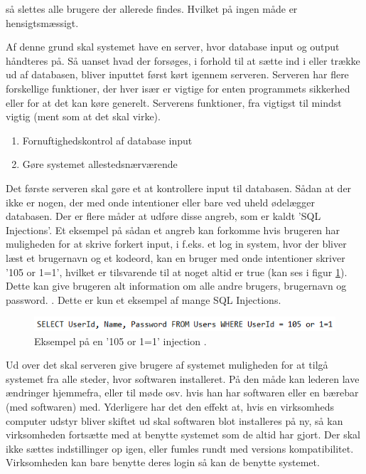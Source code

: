så slettes alle brugere der allerede findes. Hvilket på ingen måde er hensigtsmæssigt.

Af denne grund skal systemet have en server, hvor database input og output håndteres på. Så uanset hvad der forsøges, i forhold til at sætte ind i eller trække ud af databasen, bliver inputtet først kørt igennem serveren. Serveren har flere forskellige funktioner, der hver især er vigtige for enten programmets sikkerhed eller for at det kan køre generelt. Serverens funktioner, fra vigtigst til mindst vigtig (ment som at det skal virke).

\begin{enumerate}
    \item Fornuftighedskontrol af database input
    \item Gøre systemet allestedsnærværende
\end{enumerate}

Det første serveren skal gøre et at kontrollere input til databasen. Sådan at der ikke er nogen, der med onde intentioner eller bare ved uheld ødelægger databasen. Der er flere måder at udføre disse angreb, som er kaldt 'SQL Injections'. Et eksempel på sådan et angreb kan forkomme hvis brugeren har muligheden for at skrive forkert input, i f.eks. et log in system, hvor der bliver læst et brugernavn og et kodeord, kan en bruger med onde intentioner skriver '105 or 1=1', hvilket er tilsvarende til at noget altid er true (kan ses i figur \ref{fig:injection}). Dette kan give brugeren alt information om alle andre brugers, brugernavn og password. \citep{inject, TNSQLI}. Dette er kun et eksempel af mange SQL Injections. 

\begin{figure}[H]
\centering
\includegraphics{figures/injection.PNG}
\caption{Eksempel på en '105 or 1=1' injection \citep{inject}.}
\label{fig:injection}
\end{figure}

Ud over det skal serveren give brugere af systemet muligheden for at tilgå systemet fra alle steder, hvor softwaren installeret. På den måde kan lederen lave ændringer hjemmefra, eller til møde osv. hvis han har softwaren eller en bærebar (med softwaren) med. Yderligere har det den effekt at, hvis en virksomheds computer udstyr bliver skiftet ud skal softwaren blot installeres på ny, så kan virksomheden fortsætte med at benytte systemet som de altid har gjort. Der skal ikke sættes indstillinger op igen, eller fumles rundt med versions kompatibilitet. Virksomheden kan bare benytte deres login så kan de benytte systemet. \\

